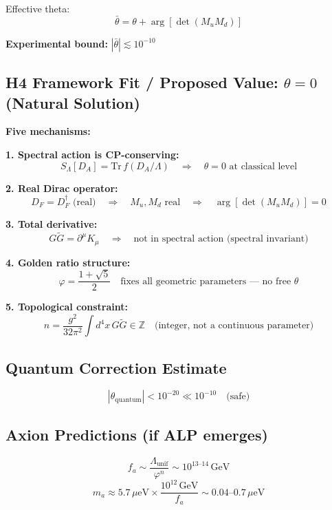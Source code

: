 \documentclass[11pt]{article}
\begin{document}
Effective theta:
\begin{equation}
\bar{\theta} = \theta + \arg[\det(M_u M_d)]
\end{equation}

\textbf{Experimental bound:} $|\bar{\theta}| \lesssim 10^{-10}$

\subsection{H4 Framework Fit / Proposed Value: $\theta = 0$ (Natural Solution)}

\textbf{Five mechanisms:}

\textbf{1. Spectral action is CP-conserving:}
\begin{equation}
S_\Lambda[D_A] = \mathrm{Tr}\, f(D_A/\Lambda) \quad \Rightarrow \quad \theta = 0 \text{ at classical level}
\end{equation}

\textbf{2. Real Dirac operator:}
\begin{equation}
D_F = D_F^\dagger \text{ (real)} \quad \Rightarrow \quad M_u, M_d \text{ real} \quad \Rightarrow \quad \arg[\det(M_u M_d)] = 0
\end{equation}

\textbf{3. Total derivative:}
\begin{equation}
G\tilde{G} = \partial^\mu K_\mu \quad \Rightarrow \quad \text{not in spectral action (spectral invariant)}
\end{equation}

\textbf{4. Golden ratio structure:}
\begin{equation}
\varphi = \frac{1+\sqrt{5}}{2} \quad \text{fixes all geometric parameters --- no free } \theta
\end{equation}

\textbf{5. Topological constraint:}
\begin{equation}
n = \frac{g^2}{32\pi^2} \int d^4x\, G\tilde{G} \in \mathbb{Z} \quad \text{(integer, not a continuous parameter)}
\end{equation}

\subsection{Quantum Correction Estimate}
\begin{equation}
|\theta_{\text{quantum}}| < 10^{-20} \ll 10^{-10} \quad \text{(safe)}
\end{equation}

\subsection{Axion Predictions (if ALP emerges)}
\begin{equation}
f_a \sim \frac{\Lambda_{\text{unif}}}{\varphi^n} \sim 10^{13\text{--}14}\, \text{GeV}
\end{equation}
\begin{equation}
m_a \approx 5.7\, \mu\text{eV} \times \frac{10^{12}\,\text{GeV}}{f_a} \sim 0.04\text{--}0.7\, \mu\text{eV}
\end{equation}
\end{document}
